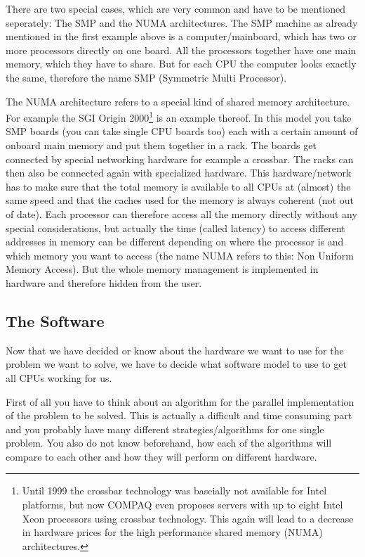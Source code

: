 There are two special cases, which are very common and have to be mentioned
seperately: The SMP and the NUMA architectures. The SMP machine as 
already mentioned in the first example above is a computer/mainboard,
which has two or more processors directly on one board. All the processors 
together have one main memory, which they have to share. But for each
CPU the computer looks exactly the same, therefore the name SMP 
(Symmetric Multi Processor).

The NUMA architecture refers to a special kind of shared memory architecture.
For example the SGI Origin 2000\footnote{Until 1999 the crossbar technology was 
bascially not available for Intel platforms, but now COMPAQ even proposes
servers with up to eight Intel Xeon processors using crossbar technology. This
again will lead to a decrease in hardware prices for the high performance
shared memory (NUMA) architectures.} 
is an example thereof. In this model
you take SMP boards (you can take single CPU boards too) each with
a certain amount of onboard main memory and 
put them together in a rack. The boards get connected by special
networking hardware for example a crossbar. The racks can then
also be connected again with specialized hardware. This hardware/network
has to make sure that the total memory is available to all CPUs at
(almost) the same speed and that the caches used for the memory
is always coherent (not out of date). Each processor can therefore
access all the memory directly without any special considerations, but
actually the time (called latency) to access different addresses in
memory can be different depending on where the processor is and
which memory you want to access (the name NUMA refers to this: Non Uniform 
Memory Access). But the whole memory management is
implemented in hardware and therefore hidden from the user.


\subsection{The Software}
Now that we have decided or know about the hardware we want to use
for the problem we want to solve, we have to decide what software
model to use to get all CPUs working for us.  

First of all you have to think about an algorithm for the parallel
implementation of the problem to be solved. This is actually a 
difficult and time consuming part and you probably have many different
strategies/algorithms for one single problem. 
You also do not know beforehand, how
each of the algorithms will compare to each other and 
how they will perform on different hardware.

